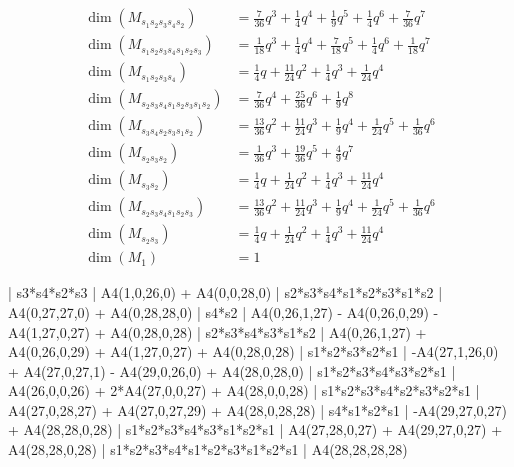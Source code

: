 \documentclass{amsart}
\theoremstyle{definition}
\begin{document}
\begin{table}[p]
{\begin{align*}
\dim(M_{s_1s_2s_3s_4s_2}) & = \frac{7}{36}q^3 + \frac{1}{4}q^4 + \frac{1}{9}q^5 + \frac{1}{4}q^6 + \frac{7}{36}q^7 \\
\dim(M_{s_1s_2s_3s_4s_1s_2s_3}) & = \frac{1}{18}q^3 + \frac{1}{4}q^4 + \frac{7}{18}q^5 + \frac{1}{4}q^6 + \frac{1}{18}q^7 \\
\dim(M_{s_1s_2s_3s_4}) & = \frac{1}{4}q + \frac{11}{24}q^2 + \frac{1}{4}q^3 + \frac{1}{24}q^4 \\
\dim(M_{s_2s_3s_4s_1s_2s_3s_1s_2}) & = \frac{7}{36}q^4 + \frac{25}{36}q^6 + \frac{1}{9}q^8 \\
\dim(M_{s_3s_4s_2s_3s_1s_2}) & = \frac{13}{36}q^2 + \frac{11}{24}q^3 + \frac{1}{9}q^4 + \frac{1}{24}q^5 + \frac{1}{36}q^6 \\
\dim(M_{s_2s_3s_2}) & = \frac{1}{36}q^3 + \frac{19}{36}q^5 + \frac{4}{9}q^7 \\
\dim(M_{s_3s_2}) & = \frac{1}{4}q + \frac{1}{24}q^2 + \frac{1}{4}q^3 + \frac{11}{24}q^4 \\
\dim(M_{s_2s_3s_4s_1s_2s_3}) & = \frac{13}{36}q^2 + \frac{11}{24}q^3 + \frac{1}{9}q^4 + \frac{1}{24}q^5 + \frac{1}{36}q^6 \\
\dim(M_{s_2s_3}) & = \frac{1}{4}q + \frac{1}{24}q^2 + \frac{1}{4}q^3 + \frac{11}{24}q^4 \\
\dim(M_{1}) & = 1
    \end{align*}}
    \fi
    \end{table}
\iffalse
| s3*s4*s2*s3       | A4(1,0,26,0) + A4(0,0,28,0) 
| s2*s3*s4*s1*s2*s3*s1*s2   | A4(0,27,27,0) + A4(0,28,28,0)      
| s4*s2     | A4(0,26,1,27) - A4(0,26,0,29) - A4(1,27,0,27) + A4(0,28,0,28)                   
| s2*s3*s4*s3*s1*s2     | A4(0,26,1,27) + A4(0,26,0,29) + A4(1,27,0,27) + A4(0,28,0,28)
| s1*s2*s3*s2*s1   | -A4(27,1,26,0) + A4(27,0,27,1) - A4(29,0,26,0) + A4(28,0,28,0)        
| s1*s2*s3*s4*s3*s2*s1 | A4(26,0,0,26) + 2*A4(27,0,0,27) + A4(28,0,0,28)                                 
| s1*s2*s3*s4*s2*s3*s2*s1  | A4(27,0,28,27) + A4(27,0,27,29) + A4(28,0,28,28)                                
| s4*s1*s2*s1   | -A4(29,27,0,27) + A4(28,28,0,28)           
| s1*s2*s3*s4*s3*s1*s2*s1    | A4(27,28,0,27) + A4(29,27,0,27) + A4(28,28,0,28)                                
| s1*s2*s3*s4*s1*s2*s3*s1*s2*s1 | A4(28,28,28,28)       
\end{document}
